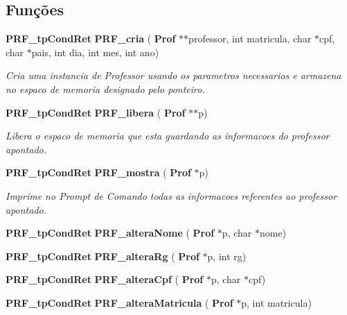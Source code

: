 \subsection*{Funções}
\begin{DoxyCompactItemize}
\item 
\textbf{ P\+R\+F\+\_\+tp\+Cond\+Ret} \textbf{ P\+R\+F\+\_\+cria} (\textbf{ Prof} $\ast$$\ast$professor, int matricula, char $\ast$cpf, char $\ast$pais, int dia, int mes, int ano)
\begin{DoxyCompactList}\small\item\em Cria uma instancia de Professor usando os parametros necessarios e armazena no espaco de memoria designado pelo ponteiro. \end{DoxyCompactList}\item 
\textbf{ P\+R\+F\+\_\+tp\+Cond\+Ret} \textbf{ P\+R\+F\+\_\+libera} (\textbf{ Prof} $\ast$$\ast$p)
\begin{DoxyCompactList}\small\item\em Libera o espaco de memoria que esta guardando as informacoes do professor apontado. \end{DoxyCompactList}\item 
\textbf{ P\+R\+F\+\_\+tp\+Cond\+Ret} \textbf{ P\+R\+F\+\_\+mostra} (\textbf{ Prof} $\ast$p)
\begin{DoxyCompactList}\small\item\em Imprime no Prompt de Comando todas as informacoes referentes ao professor apontado. \end{DoxyCompactList}\item 
\mbox{\label{group__modulo_professor_ga87f61b19dea8901414a67d1f993a70e6}} 
\textbf{ P\+R\+F\+\_\+tp\+Cond\+Ret} {\bfseries P\+R\+F\+\_\+altera\+Nome} (\textbf{ Prof} $\ast$p, char $\ast$nome)
\item 
\mbox{\label{group__modulo_professor_gaf66878449d7b7162d340ae655ddfc0df}} 
\textbf{ P\+R\+F\+\_\+tp\+Cond\+Ret} {\bfseries P\+R\+F\+\_\+altera\+Rg} (\textbf{ Prof} $\ast$p, int rg)
\item 
\mbox{\label{group__modulo_professor_gad697ae18f0d3bde1eb08962e75458c08}} 
\textbf{ P\+R\+F\+\_\+tp\+Cond\+Ret} {\bfseries P\+R\+F\+\_\+altera\+Cpf} (\textbf{ Prof} $\ast$p, char $\ast$cpf)
\item 
\mbox{\label{group__modulo_professor_gab3f35cd2697cb84dd63dcf17241c7a93}} 
\textbf{ P\+R\+F\+\_\+tp\+Cond\+Ret} {\bfseries P\+R\+F\+\_\+altera\+Matricula} (\textbf{ Prof} $\ast$p, int matricula)
\item 
\mbox{\label{group__modulo_professor_ga5d446e97b7ba0c31bed519dd8afe1f2b}} 

\end{DoxyCompactItemize}
